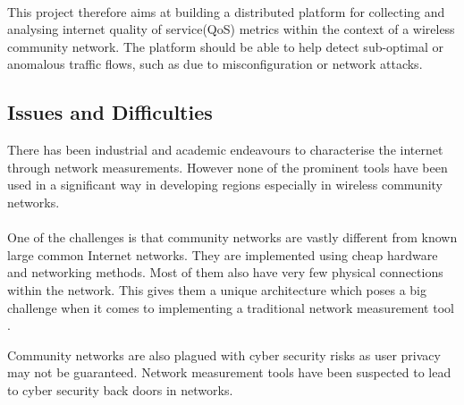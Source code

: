 \paragraph{}
This project therefore aims at building a distributed platform for collecting and analysing internet quality of service(QoS) metrics within the context of a wireless community network. The platform should be able to help detect sub-optimal or anomalous traffic flows, such as due to misconfiguration or network attacks.

\subsection{Issues and Difficulties}
There has been industrial and academic endeavours to characterise the internet through network measurements. However none of the prominent tools have been used in a significant way in developing regions especially in wireless community networks.
\paragraph{}
One of the challenges is that community networks are vastly different from known large common Internet networks. They are implemented using cheap hardware and networking methods. Most of them also have very few physical connections within the network. This gives them a unique architecture which poses a big challenge when it comes to implementing a traditional network measurement tool \cite{Braem:2013:CRC:2500098.2500108}.

Community networks are also plagued with cyber security risks as user privacy may not be guaranteed. Network measurement tools have been suspected to lead to cyber security back doors in networks. 


